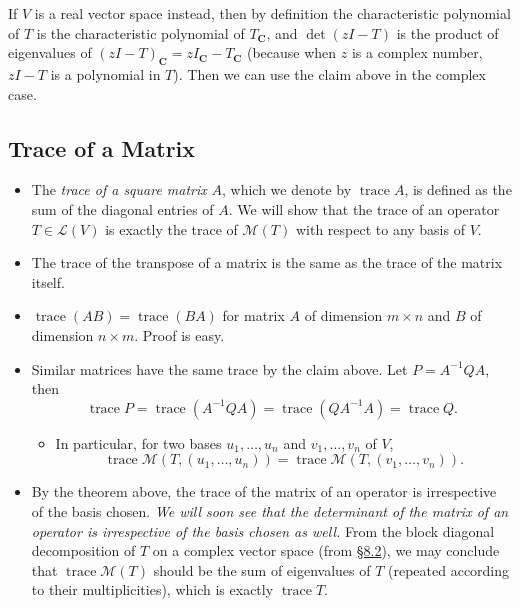 \documentclass[11pt]{article}
\newcommand{\lk}[2]{\hyperlink{subsection.#1.#2}{\S#1.#2}}
\newcommand{\df}[1]{\textit{\textsf{#1}}}
\newcommand{\C}{\mathbf{C}}
\newcommand{\tr}{\operatorname{trace}}
\newcommand{\LV}{\mathcal{L}(V)}
\newcommand{\M}{\mathcal{M}}
\begin{document}
\begin{itemize}
    If $V$ is a real vector space instead, then by definition  the characteristic polynomial of $T$ is the characteristic polynomial of $T_\C$, and $\det(zI - T)$ is the product of eigenvalues of $(zI - T)_\C = zI_\C - T_\C$ (because when $z$ is a complex number, $zI - T$ is a polynomial in $T$). Then we can use the claim above in the complex case.
\end{itemize}

\subsection{Trace of a Matrix}
\begin{itemize}
    \item The \df{trace of a square matrix} $A$, which we denote by $\tr A$, is defined as the sum of the diagonal entries of $A$. We will show that the trace of an operator $T \in \LV$ is exactly the trace of $\M(T)$ with respect to any basis of $V$.
    \item The trace of the transpose of a matrix is the same as the trace of the matrix itself.
    \item $\tr(AB) = \tr(BA)$ for matrix $A$ of dimension $m \times n$ and $B$ of dimension $n \times m$. Proof is easy.
    \item Similar matrices have the same trace by the claim above. Let $P = A^{-1}QA$, then \[\tr P = \tr(A^{-1}QA) = \tr(QA^{-1}A) = \tr Q.\]
    \begin{itemize}
        \item In particular, for two bases $u_1,\dots,u_n$ and $v_1,\dots,v_n$ of $V$, \[\tr \M(T,(u_1,\dots,u_n)) = \tr \M(T,(v_1,\dots,v_n)).\]
    \end{itemize}
    \item By the theorem above, the trace of the matrix of an operator is irrespective of the basis chosen. \emph{We will soon see that the determinant of the matrix of an operator is irrespective of the basis chosen as well.} From the block diagonal decomposition of $T$ on a complex vector space (from \lk{8}{2}), we may conclude that $\tr \M(T)$ should be the sum of eigenvalues of $T$ (repeated according to their multiplicities), which is exactly $\tr T$.
    

\end{itemize}
\end{document}

